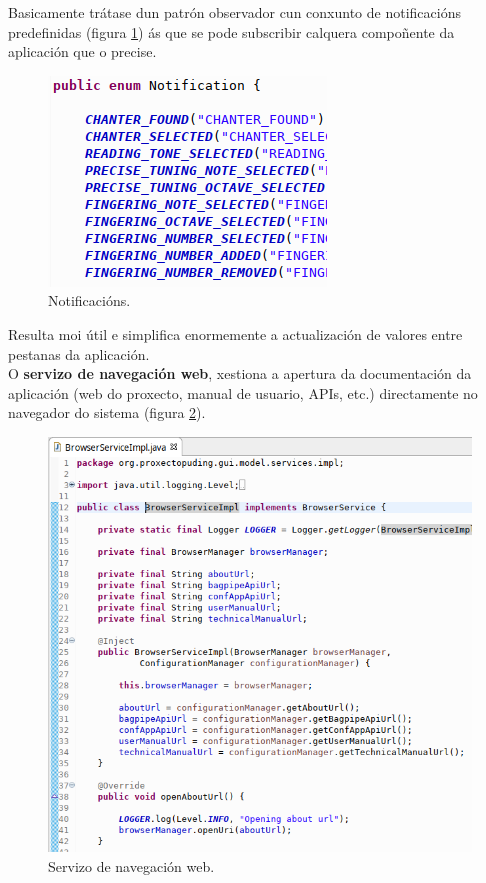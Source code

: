    Basicamente trátase dun patrón observador cun conxunto de notificacións
   predefinidas (figura \ref{figura:Notificacions}) ás que se pode subscribir
   calquera compoñente da aplicación que o precise. \\
   
   \begin{figure}[htbp]
    \centering
    \includegraphics[scale=0.6, keepaspectratio=true]{./imagenes/notificacions.png}
    \caption{Notificacións.}
    \label{figura:Notificacions}
   \end{figure}
   
   Resulta moi útil e simplifica enormemente a actualización de valores entre
   pestanas da aplicación. \\
   
   O \textbf{servizo de navegación web}, xestiona a apertura da documentación da
   aplicación (web do proxecto, manual de usuario, APIs, etc.) directamente no
   navegador do sistema (figura \ref{figura:Navegador}). \\
   
   \begin{figure}[htbp]
    \centering
    \includegraphics[scale=0.6, keepaspectratio=true]{./imagenes/navegador.png}
    \caption{Servizo de navegación web.}
    \label{figura:Navegador}
   \end{figure}
   
